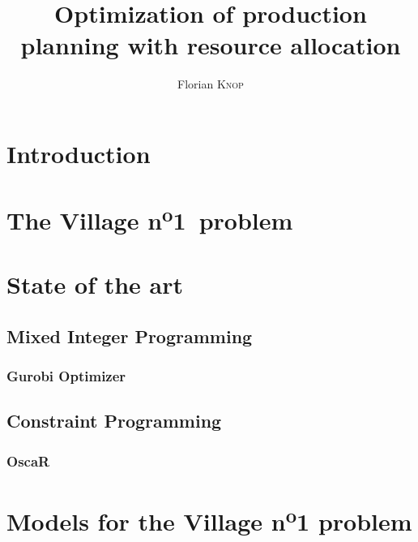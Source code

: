 \documentclass{template/EPL-master-thesis-covers-EN}
\title{Optimization of production planning with resource allocation}
\author{Florian \textsc{Knop}}
\begin{document}
  
  \def\chapterautorefname{Chapter}
  \def\sectionautorefname{Section}
  \newcommand{\vone}{Village n\textsuperscript{o}1}

  
  \maketitle

  \tableofcontents

  \chapter{Introduction}
  \label{chapter:introduction}
  

  \chapter{The \vone\ problem}
  \label{chapter:problem}
  


  \chapter{State of the art}
  \label{chapter:sota}

  \section{Mixed Integer Programming}
  

  \subsection{Gurobi Optimizer}
  \label{subsection:gurobi}
  

  \section{Constraint Programming}
  

  \subsection{OscaR}
  \label{subsection:oscar}
  
  
  \chapter{Models for the Village n\textsuperscript{o}1 problem}
  \label{chapter:models}
\end{document}
